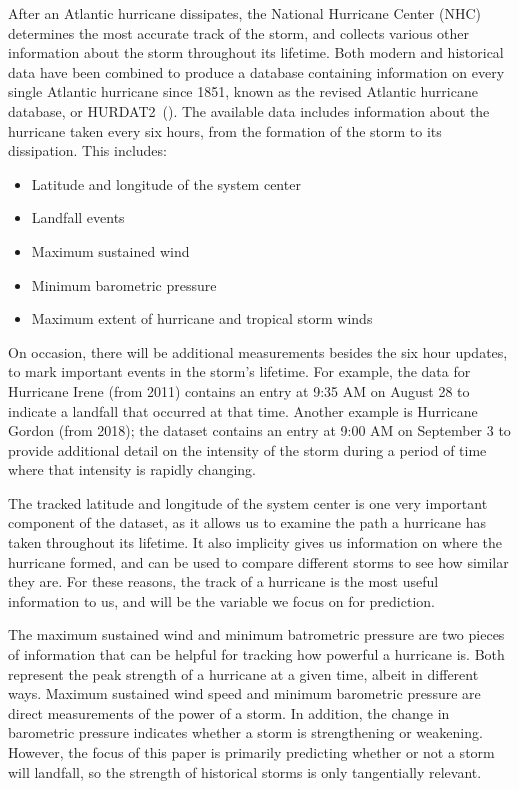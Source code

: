 
\par
After an Atlantic hurricane dissipates, the National Hurricane Center (NHC) determines the most accurate track of the storm, and collects various other information about the storm throughout its lifetime.
Both modern and historical data have been combined to produce a database containing information on every single Atlantic hurricane since 1851, known as the revised Atlantic hurricane database, or HURDAT2~(\cite{landsea2015revised}).
The available data includes information about the hurricane taken every six hours, from the formation of the storm to its dissipation.
This includes:
\begin{itemize}
	\item Latitude and longitude of the system center
	\item Landfall events
	\item Maximum sustained wind
	\item Minimum barometric pressure
	\item Maximum extent of hurricane and tropical storm winds
\end{itemize}

\par
On occasion, there will be additional measurements besides the six hour updates, to mark important events in the storm's lifetime.
For example, the data for Hurricane Irene (from 2011) contains an entry at 9:35 AM on August 28 to indicate a landfall that occurred at that time.
Another example is Hurricane Gordon (from 2018); the dataset contains an entry at 9:00 AM on September 3 to provide additional detail on the intensity of the storm during a period of time where that intensity is rapidly changing.

\par
The tracked latitude and longitude of the system center is one very important component of the dataset, as it allows us to examine the path a hurricane has taken throughout its lifetime.
It also implicity gives us information on where the hurricane formed, and can be used to compare different storms to see how similar they are.
For these reasons, the track of a hurricane is the most useful information to us, and will be the variable we focus on for prediction.

\par
The maximum sustained wind and minimum batrometric pressure are two pieces of information that can be helpful for tracking how powerful a hurricane is.
Both represent the peak strength of a hurricane at a given time, albeit in different ways.
Maximum sustained wind speed and minimum barometric pressure are direct measurements of the power of a storm.
In addition, the change in barometric pressure indicates whether a storm is strengthening or weakening.
However, the focus of this paper is primarily predicting whether or not a storm will landfall, so the strength of historical storms is only tangentially relevant.

